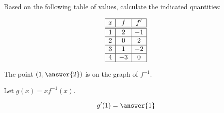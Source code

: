 \documentclass{ximera}
\author{Steven Gubkin}
\begin{document}
\begin{exercise}



Based on the following table of values, calculate the indicated quantities:

 \[
  \begin{array}{|c|c|c|}\hline
    x & f  & f' \\ \hline \hline
    1 & 2 & -1 \\ \hline
    2 & 0  & 2  \\ \hline
    3 & 1  & -2 \\ \hline
    4 & -3 & 0  \\ \hline
  \end{array}
  \]

The point $(1, \answer{2})$ is on the graph of $f^{-1}$.

Let $g(x) =  xf^{-1}(x)$.  

\[
g'(1) = \answer{1}
\]

\end{exercise}
\end{document}
